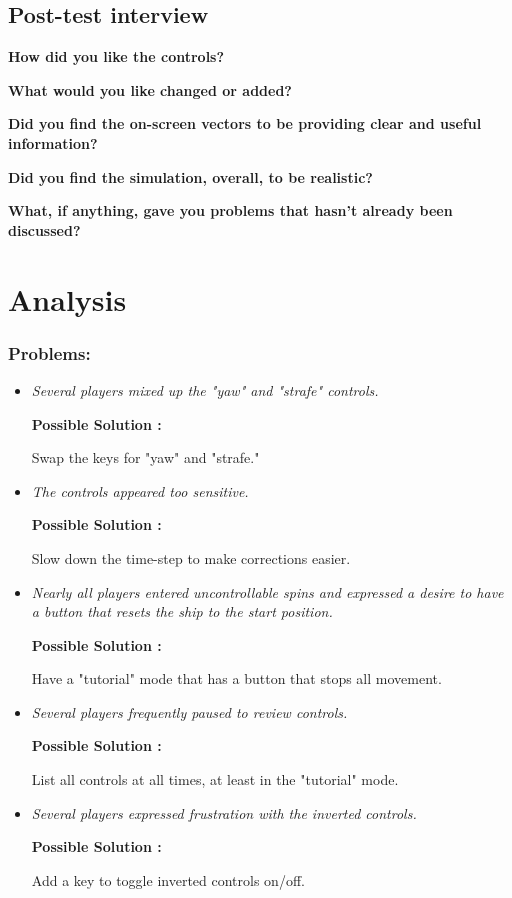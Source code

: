 \subsection{Post-test interview}

\vspace{5mm}
\noindent\textbf{How did you like the controls?}

\vspace{5mm}
\noindent\textbf{What would you like changed or added?}

\vspace{5mm}
\noindent\textbf{Did you find the on-screen vectors to be providing clear and useful information?}

\vspace{5mm}
\noindent\textbf{Did you find the simulation, overall, to be realistic?}

\vspace{5mm}
\noindent\textbf{What, if anything, gave you problems that hasn't already been discussed?}

\section{Analysis}

\subsubsection{Problems:}

\begin{itemize}

  \item \emph{Several players mixed up the "yaw" and "strafe" controls.}
        
        \textbf{Possible Solution : } \parbox[t]{5in}{Swap the keys for "yaw" and "strafe."}
				
  \item \emph{The controls appeared too sensitive.}
        
        \textbf{Possible Solution : } \parbox[t]{5in}{Slow down the time-step to make corrections easier.}
				
  \item \emph{Nearly all players entered uncontrollable spins and expressed a desire to have a button that resets the ship to the start position.}
        
        \textbf{Possible Solution : } \parbox[t]{5in}{Have a "tutorial" mode that has a button that stops all movement.}

  \item \emph{Several players frequently paused to review controls.}
        
        \textbf{Possible Solution : } \parbox[t]{5in}{List all controls at all times, at least in the "tutorial" mode.}
				
	\item \emph{Several players expressed frustration with the inverted controls.}
        
        \textbf{Possible Solution : } \parbox[t]{5in}{Add a key to toggle inverted controls on/off.}	

\end{itemize}




